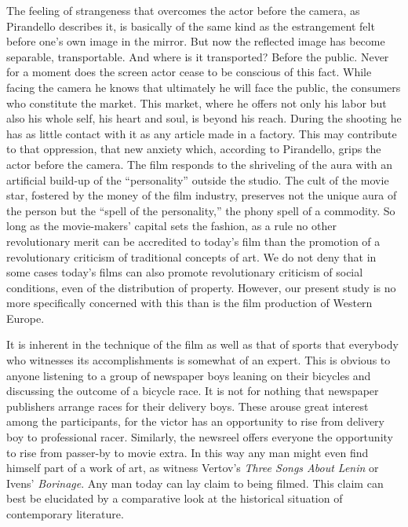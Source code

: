 \documentclass[11pt, letterpaper]{article}
\begin{document}
The feeling of strangeness that overcomes the actor before the camera, as
Pirandello describes it, is basically of the same kind as the estrangement felt
before one’s own image in the mirror. But now the reflected image has become
separable, transportable. And where is it transported? Before the public. Never
for a moment does the screen actor cease to be conscious of this fact. While
facing the camera he knows that ultimately he will face the public, the
consumers who constitute the market. This market, where he offers not only his
labor but also his whole self, his heart and soul, is beyond his reach. During
the shooting he has as little contact with it as any article made in a factory.
This may contribute to that oppression, that new anxiety which, according to
Pirandello, grips the actor before the camera. The film responds to the
shriveling of the aura with an artificial build-up of the “personality” outside
the studio. The cult of the movie star, fostered by the money of the film
industry, preserves not the unique aura of the person but the “spell of the
personality,” the phony spell of a commodity. So long as the movie-makers’
capital sets the fashion, as a rule no other revolutionary merit can be
accredited to today’s film than the promotion of a revolutionary criticism of
traditional concepts of art. We do not deny that in some cases today’s films
can also promote revolutionary criticism of social conditions, even of the
distribution of property. However, our present study is no more specifically
concerned with this than is the film production of Western Europe.

It is inherent in the technique of the film as well as that of sports that
everybody who witnesses its accomplishments is somewhat of an expert. This is
obvious to anyone listening to a group of newspaper boys leaning on their
bicycles and discussing the outcome of a bicycle race. It is not for nothing
that newspaper publishers arrange races for their delivery boys. These arouse
great interest among the participants, for the victor has an opportunity to
rise from delivery boy to professional racer. Similarly, the newsreel offers
everyone the opportunity to rise from passer-by to movie extra. In this way any
man might even find himself part of a work of art, as witness Vertov’s
\textit{Three Songs About Lenin} or Ivens’ \textit{Borinage}. Any man today can
lay claim to being filmed. This claim can best be elucidated by a comparative
look at the historical situation of contemporary literature.
\end{document}
